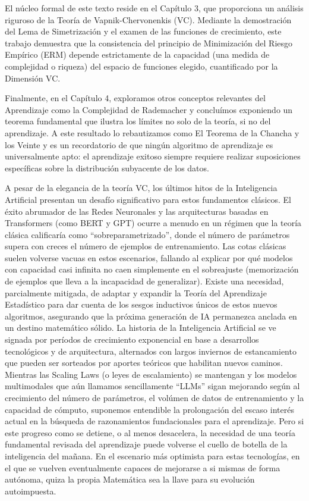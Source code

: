 \documentclass{report}
\begin{document}
El núcleo formal de este texto reside en el Capítulo 3, que proporciona un análisis riguroso de la Teoría de Vapnik-Chervonenkis (VC).
Mediante la demostración del Lema de Simetrización y el examen de las funciones de crecimiento, este trabajo demuestra que la
consistencia del principio de Minimización del Riesgo Empírico (ERM) depende estrictamente de la capacidad (una medida de complejidad
o riqueza) del espacio de funciones
elegido, cuantificado por la Dimensión VC.


Finalmente, en el Capítulo 4, exploramos otros conceptos relevantes del Aprendizaje como la Complejidad de Rademacher y concluímos exponiendo
un teorema fundamental que ilustra los límites no solo de la teoría, si no del aprendizaje. A este resultado lo rebautizamos como El Teorema de la Chancha
y los Veinte y es un recordatorio de que ningún algoritmo
de aprendizaje es universalmente apto: el aprendizaje exitoso siempre requiere realizar suposiciones específicas sobre la
distribución subyacente de los datos.


A pesar de la elegancia de la teoría VC, los últimos hitos de la Inteligencia Artificial presentan un desafío significativo para estos fundamentos clásicos.
El éxito abrumador de las Redes Neuronales y las arquitecturas basadas en Transformers (como BERT y GPT) ocurre a menudo en
un régimen que la teoría clásica calificaría como ``sobreparametrizado'', donde el número de parámetros supera con creces el número
de ejemplos de entrenamiento. Las cotas clásicas suelen volverse vacuas en estos escenarios, fallando al explicar por qué modelos
con capacidad casi infinita no caen simplemente en el sobreajuste (memorización de ejemplos que lleva a la incapacidad de generalizar). Existe una necesidad,
parcialmente mitigada, de adaptar y expandir
la Teoría del Aprendizaje Estadístico para dar cuenta de los sesgos inductivos únicos de estos nuevos algoritmos, asegurando que la
próxima generación de IA permanezca anclada en un destino matemático sólido. La historia de la Inteligencia Artificial se ve signada
por períodos de crecimiento exponencial en base a desarrollos tecnológicos y de arquitectura, alternados con largos inviernos de estancamiento
que pueden ser sorteados por aportes teóricos que habilitan nuevos caminos. Mientras las Scaling Laws (o leyes de escalamiento) se mantengan y los
modelos multimodales que aún llamamos sencillamente ``LLMs'' sigan mejorando según al crecimiento del número de parámetros, el volúmen de datos de entrenamiento
y la capacidad de cómputo, suponemos entendible la prolongación del escaso interés actual en la búsqueda de razonamientos fundacionales para el aprendizaje. Pero
si este progreso como se detiene, o al menos desacelera, la necesidad de una teoría fundamental revisada del aprendizaje puede volverse
el cuello de botella de la inteligencia del mañana. En el escenario más optimista para estas tecnologías, en el que se vuelven eventualmente
capaces de mejorarse a si mismas de forma autónoma, quiza la propia Matemática sea la llave para su evolución autoimpuesta.
\end{document}
